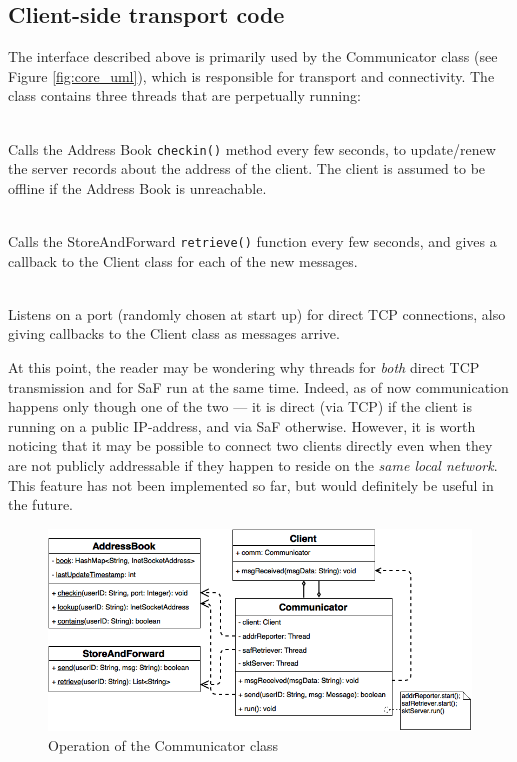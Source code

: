 \documentclass[a4paper, twoside, 12pt]{report}
\begin{document}

\subsection{Client-side transport code}
\label{subsec:impl.prep.transport}
The interface described above is primarily used by the Communicator class (see Figure \ref{fig:core_uml}), which is responsible for transport and connectivity. The class contains three threads that are perpetually running:
\begin{description}[labelindent=0.5cm, leftmargin=1.3cm, rightmargin=0.5cm]
    \item[Address-reporting thread] \hfill \\
        Calls the Address Book \texttt{checkin()} method every few seconds, to update/renew the server records about the address of the client. The client is assumed to be offline if the Address Book is unreachable.
    \item[SaF Querying Thread] \hfill \\
        Calls the StoreAndForward \texttt{retrieve()} function every few seconds, and gives a callback to the Client class for each of the new messages.
    \item[TCP Socket Server Thread] \hfill \\
        Listens on a port (randomly chosen at start up) for direct TCP connections, also giving callbacks to the Client class as messages arrive.
\end{description}
At this point, the reader may be wondering why threads for \emph{both} direct TCP transmission and for SaF run at the same time. Indeed, as of now communication happens only though one of the two --- it is direct (via TCP) if the client is running on a public IP-address, and via SaF otherwise. However, it is worth noticing that it may be possible to connect two clients directly even when they are not publicly addressable if they happen to reside on the \emph{same local network}. This feature has not been implemented so far, but would definitely be useful in the future. \\

\begin{figure}[H]
\centering
\includegraphics[width = 0.8 \linewidth]{pics/communicator_uml.png}
\caption{\label{fig:communicator_uml} Operation of the Communicator class}
\end{figure}
\end{document}
